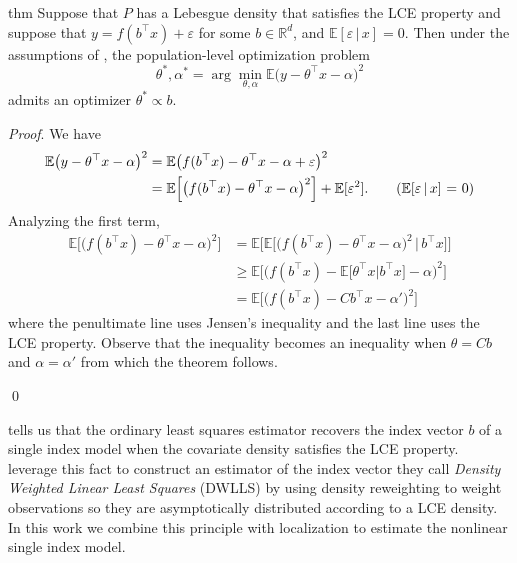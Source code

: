 \documentclass[11pt]{article}
\begin{document}
\begin{restatable}{thm}{} \label{thm: lce single index}
    Suppose that $P$ has a Lebesgue density that satisfies the LCE property and suppose that $y = f(b^{\top}x) + \varepsilon$ for some $b \in \mathbb{R}^d$, and $\mathbb{E}[\varepsilon \,| \, x] = 0$. Then under the assumptions of \citet[Theorem 2.1]{li1989regression}, the population-level optimization problem 
    \[\theta^*, \alpha^* = \arg\min_{\theta, \alpha}\mathbb{E}\big(y - \theta^{\top}x - \alpha\big)^2 \]
    admits an optimizer $\theta^* \propto b$. 
\end{restatable}
\noindent \textit{Proof}. We have 
\begin{align*}
    \mathbb{E}\big(y - \theta^{\top}x-\alpha\big)^2 &= \mathbb{E}\big(f(b^{\top}x) - \theta^{\top}x-\alpha  + \varepsilon\big)^2\\
    &= \mathbb{E}\Big[\big(f(b^{\top}x) - \theta^{\top}x-\alpha\big)^2\Big] + \mathbb{E}[\varepsilon^2]. \tag{$\mathbb{E}[\varepsilon \,|\,x]$ = 0}
\end{align*}
Analyzing the first term, 
\begin{align*}
    \mathbb{E}\Big[\big(f(b^{\top}x) - \theta^{\top}x-\alpha\big)^2\Big]&= \mathbb{E}\Big[ \mathbb{E}\Big[\big(f(b^{\top}x) - \theta^{\top}x-\alpha\big)^2 \, \Big | \, b^{\top}x\Big] \Big] \\
    &\geq \mathbb{E}\Big[ \Big(f(b^{\top}x) - \mathbb{E}\big[\theta^{\top}x |b^{\top}x\big]-\alpha\Big)^2 \Big] \\
    &= \mathbb{E}\Big[ \Big(f(b^{\top}x) - Cb^{\top}x-\alpha'\Big)^2 \Big]
\end{align*}
where the penultimate line uses Jensen's inequality and the last line uses the LCE property. Observe that the inequality becomes an inequality when $\theta = Cb$ and $\alpha = \alpha'$ from which the theorem follows. 

\qed{}

 tells us that the ordinary least squares estimator recovers the index vector $b$ of a single index model when the covariate density satisfies the LCE property. \citet{Newey_Ruud_2005} leverage this fact to construct an estimator of the index vector they call \emph{Density Weighted Linear Least Squares} (DWLLS) by using density reweighting to weight observations so they are asymptotically distributed according to a LCE density. In this work we combine this principle with localization to estimate the nonlinear single index model. 
\end{document}
